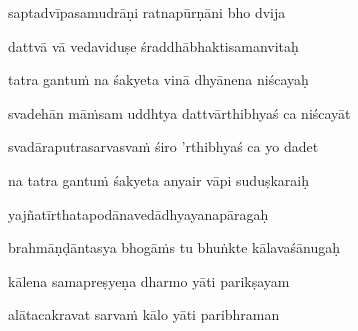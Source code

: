 saptadvīpasamudrāṇi ratnapūrṇāni bho dvija\thinspace{\dandab} \dontdisplaylinenum

dattvā vā vedaviduṣe śraddhābhaktisamanvitaḥ \danda\dontdisplaylinenum

tatra gantu\.m na śakyeta vinā dhyānena niścayaḥ \veg\dontdisplaylinenum

svadehān mā\.msam uddhtya dattvārthibhyaś ca niścayāt\thinspace{\dandab} \dontdisplaylinenum

svadāraputrasarvasva\.m śiro 'rthibhyaś ca yo dadet \danda\dontdisplaylinenum

na tatra gantu\.m śakyeta anyair vāpi suduṣkaraiḥ \veg\dontdisplaylinenum

yajñatīrthatapodānavedādhyayanapāragaḥ\thinspace{\dandab} \dontdisplaylinenum

brahmāṇḍāntasya bhogā\.ms tu bhuṅkte kālavaśānugaḥ \veg\dontdisplaylinenum

kālena samapreṣyeṇa dharmo yāti parikṣayam\thinspace{\dandab} \dontdisplaylinenum

alātacakravat sarva\.m kālo yāti paribhraman \danda\dontdisplaylinenum

